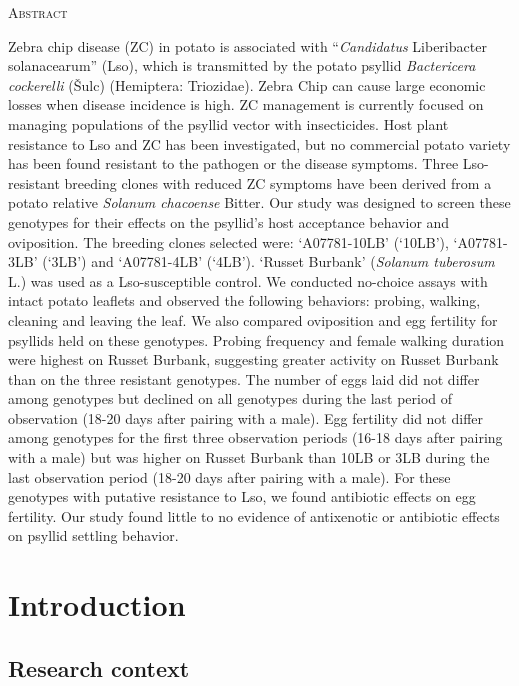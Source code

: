 \documentclass[]{article}
\title{}
\author{Austin N. Fife}
\date{24/01/2019}
\begin{document}
\textsc{Abstract}

Zebra chip disease (ZC) in potato is associated with ``\emph{Candidatus}
Liberibacter solanacearum'' (Lso), which is transmitted by the potato
psyllid \emph{Bactericera cockerelli} (Šulc) (Hemiptera: Triozidae).
Zebra Chip can cause large economic losses when disease incidence is
high. ZC management is currently focused on managing populations of the
psyllid vector with insecticides. Host plant resistance to Lso and ZC
has been investigated, but no commercial potato variety has been found
resistant to the pathogen or the disease symptoms. Three Lso-resistant
breeding clones with reduced ZC symptoms have been derived from a potato
relative \emph{Solanum chacoense} Bitter. Our study was designed to
screen these genotypes for their effects on the psyllid's host
acceptance behavior and oviposition. The breeding clones selected were:
`A07781-10LB' (`10LB'), `A07781-3LB' (`3LB') and `A07781-4LB' (`4LB').
`Russet Burbank' (\emph{Solanum tuberosum} L.) was used as a
Lso-susceptible control. We conducted no-choice assays with intact
potato leaflets and observed the following behaviors: probing, walking,
cleaning and leaving the leaf. We also compared oviposition and egg
fertility for psyllids held on these genotypes. Probing frequency and
female walking duration were highest on Russet Burbank, suggesting
greater activity on Russet Burbank than on the three resistant
genotypes. The number of eggs laid did not differ among genotypes but
declined on all genotypes during the last period of observation (18-20
days after pairing with a male). Egg fertility did not differ among
genotypes for the first three observation periods (16-18 days after
pairing with a male) but was higher on Russet Burbank than 10LB or 3LB
during the last observation period (18-20 days after pairing with a
male). For these genotypes with putative resistance to Lso, we found
antibiotic effects on egg fertility. Our study found little to no
evidence of antixenotic or antibiotic effects on psyllid settling
behavior.

\hypertarget{ch:intro}{%
\section{Introduction}\label{ch:intro}}

\hypertarget{research-context}{%
\subsection{Research context}\label{research-context}}
\end{document}
